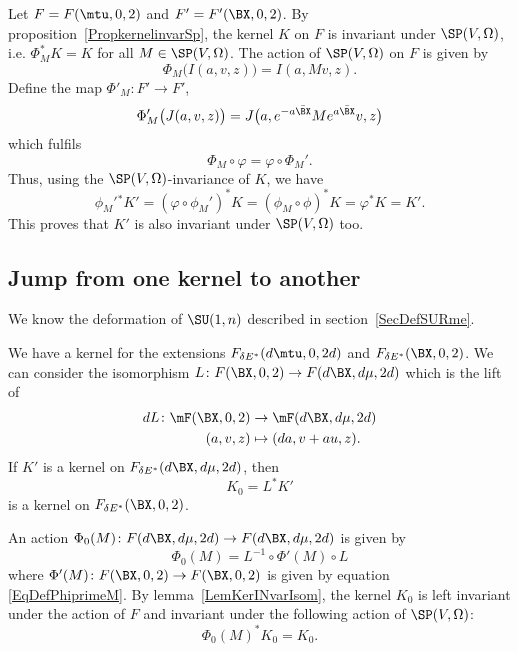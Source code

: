 Let $F=F(\mtu,0,2)$ and $F'=F'(\BX,0,2)$. By proposition~\ref{PropkernelinvarSp},  the kernel $K$ on $F$ is invariant under $\SP(V,\Omega)$, i.e. $\Phi^*_{M}K=K$ for all $M\in\SP(V,\Omega)$. The action of $\SP(V,\Omega)$ on $F$ is given by
\[
	\Phi_{M}\big( I(a,v,z) \big)=I(a,Mv,z).
\]
Define the map $\Phi'_M\colon F'\to F'$,
\begin{equation}   \label{EqDefPhiprimeM}
	\Phi_{M}'\big( J(a,v,z) \big)=J\big( a, e^{-a\bar{\BX }}M e^{a\bar{\BX }}v,z \big)
\end{equation}
which fulfils
\[
	\Phi_{M}\circ\varphi=\varphi\circ\Phi_{M}'.
\]
Thus, using the $\SP(V,\Omega)$-invariance of $K$, we have
\[
	\phi_{M}'{}^*K'=(\varphi\circ\phi_{M}')^*K=(\phi_{M}\circ\phi)^*K=\varphi^*K=K'.
\]
This proves that $K'$ is also invariant under $\SP(V,\Omega)$ too.

\subsection{Jump from one kernel to another}

We know the deformation of $\SU(1,n)$ described in section~\ref{SecDefSURme}.

We have a kernel for the extensions $F_{\delta E^*}(d\mtu,0,2d)$ and $F_{\delta E^*}(\BX ,0,2)$. We can consider the isomorphism $L\colon F(\BX ,0,2)\to F(d\BX ,d\mu,2d)$ which is the lift of
\begin{equation}
	\begin{aligned}
		dL\colon \mF(\BX ,0,2) & \to \mF(d\BX ,d\mu,2d) \\
		(a,v,z)                & \mapsto (da,v+au,z).
	\end{aligned}
\end{equation}
If $K'$ is a kernel on $F_{\delta E^*}(d\BX ,d\mu,2d)$, then
\[
	K_{0}=L^*K'
\]
is a kernel on $F_{\delta E^*}(\BX ,0,2)$.

An action $\Phi_{0}(M)\colon F(d\BX ,d\mu,2d)\to F(d\BX ,d\mu,2d)$ is given by
\begin{equation}
	\Phi_{0}(M)=L^{-1}\circ\Phi'(M)\circ L
\end{equation}
where $\Phi'(M)\colon F(\BX ,0,2)\to F(\BX ,0,2)$ is given by equation \eqref{EqDefPhiprimeM}. By lemma~\ref{LemKerINvarIsom}, the kernel $K_{0}$ is left invariant under the action of $F$ and invariant under the following action of $\SP(V,\Omega)$:
\[
	\Phi_{0}(M)^*K_{0}=K_{0}.
\]

